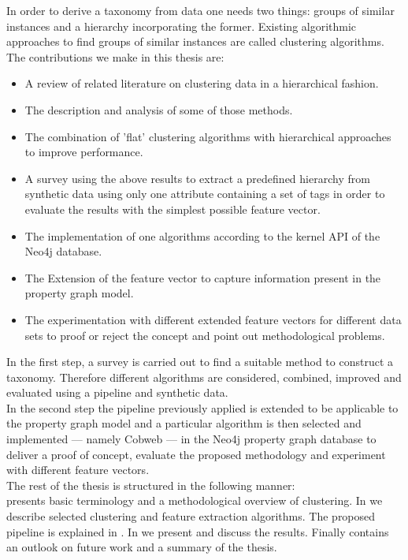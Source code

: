 \noindent In order to derive a taxonomy from data one needs two things: groups of similar instances and a hierarchy incorporating the former. Existing algorithmic approaches to find groups of similar instances are called clustering algorithms. \\

\noindent The contributions we make in this thesis are:
\begin{itemize}
    \item A review of related literature on clustering data in a hierarchical fashion.
    \item The description and analysis of some of those methods.
    \item The combination of 'flat' clustering algorithms with hierarchical approaches to improve performance.
    \item A survey using the above results to extract a predefined hierarchy from synthetic data using only one attribute containing a set of tags in order to evaluate the results with the simplest possible feature vector.
    \item The implementation of one algorithms according to the kernel API of the Neo4j database.
    \item The Extension of the feature vector to capture information present in the property graph model.
    \item The experimentation with different extended feature vectors for different data sets to proof or reject the concept and point out methodological problems.
\end{itemize} 
\vspace{0.5cm}

\noindent In the first step, a survey is carried out to find a suitable method to construct a taxonomy. Therefore different algorithms are considered, combined, improved and evaluated using a pipeline and synthetic data. \\
In the second step the pipeline previously applied is extended to be applicable to the property graph model and a particular algorithm is then selected and implemented --- namely Cobweb --- in the Neo4j property graph database to deliver a proof of concept, evaluate the proposed methodology and experiment with different feature vectors.\\

\noindent The rest of the thesis is structured in the following manner: \\
 presents basic terminology and a methodological overview of clustering. In  we describe selected clustering and feature extraction algorithms. The proposed pipeline is explained in . In  we present and discuss the results. Finally  contains an outlook on future work and a summary of the thesis.
